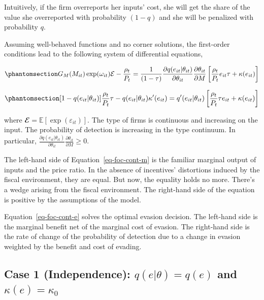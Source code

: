 \documentclass[
  12pt]{article}
\begin{document}
Intuitively, if the firm overreports her inputs' cost, she will get the
share of the value she overreported with probability \((1-q)\) and she
will be penalized with probability \(q\).

Assuming well-behaved functions and no corner solutions, the first-order
conditions lead to the following system of differential equations,

\begin{equation}\phantomsection\label{eq-foc-cont-m}{
G_M(M_{it})\exp(\omega_{it})\mathcal{E}-\frac{\rho_{t}}{P_t} = \frac{1}{(1-\tau)}\frac{\partial q(e_{it}|\theta_{it})}{\partial \theta_{it}}\frac{\partial \theta_{it}}{\partial M}\left[\frac{\rho_t}{P_t}e_{it}\tau+\kappa(e_{it})\right]
}\end{equation}

\begin{equation}\phantomsection\label{eq-foc-cont-e}{
[1-q(e_{it}|\theta_{it})]\frac{\rho_t}{P_t}\tau-q(e_{it}|\theta_{it})\kappa'(e_{it})=q'(e_{it}|\theta_{it})\left[\frac{\rho_t}{P_t}\tau e_{it} + \kappa(e_{it})\right]
}\end{equation}

where \(\mathbfcal{E}=\mathbb{E}[\exp(\varepsilon_{it})]\). The type of
firms is continuous and increasing on the input. The probability of
detection is increasing in the type continuum. In particular,
\(\frac{\partial q(e_{it}|\theta_{it})}{\partial \theta_{it}}\frac{\partial \theta_{it}}{\partial M}\ge0\).

The left-hand side of Equation~\ref{eq-foc-cont-m} is the familiar
marginal output of inputs and the price ratio. In the absence of
incentives' distortions induced by the fiscal environment, they are
equal. But now, the equality holds no more. There's a wedge arising from
the fiscal environment. The right-hand side of the equation is positive
by the assumptions of the model.

Equation~\ref{eq-foc-cont-e} solves the optimal evasion decision. The
left-hand side is the marginal benefit net of the marginal cost of
evasion. The right-hand side is the rate of change of the probability of
detection due to a change in evasion weighted by the benefit and cost of
evading.

\subsection{\texorpdfstring{Case 1 (Independence): \(q(e|\theta)=q(e)\)
and
\(\kappa(e)=\kappa_0\)}{Case 1 (Independence): q(e\textbar\textbackslash theta)=q(e) and \textbackslash kappa(e)=\textbackslash kappa\_0}}\label{case-1-independence-qethetaqe-and-kappaekappa_0}
\end{document}
